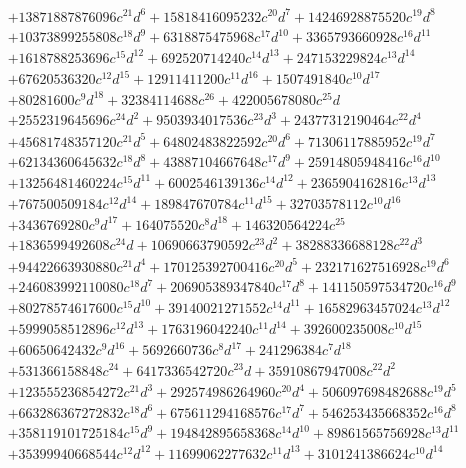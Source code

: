{\begin{align*}
&+13871887876096c^{21}d^{6}+15818416095232c^{20}d^{7}+14246928875520c^{19}d^{8}\\
&+10373899255808c^{18}d^{9}+6318875475968c^{17}d^{10}+3365793660928c^{16}d^{11}\\
&+1618788253696c^{15}d^{12}+692520714240c^{14}d^{13}+247153229824c^{13}d^{14}\\
&+67620536320c^{12}d^{15}+12911411200c^{11}d^{16}+1507491840c^{10}d^{17}\\
&+80281600c^{9}d^{18}+32384114688c^{26}+422005678080c^{25}d\\
&+2552319645696c^{24}d^{2}+9503934017536c^{23}d^{3}+24377312190464c^{22}d^{4}\\
&+45681748357120c^{21}d^{5}+64802483822592c^{20}d^{6}+71306117885952c^{19}d^{7}\\
&+62134360645632c^{18}d^{8}+43887104667648c^{17}d^{9}+25914805948416c^{16}d^{10}\\
&+13256481460224c^{15}d^{11}+6002546139136c^{14}d^{12}+2365904162816c^{13}d^{13}\\
&+767500509184c^{12}d^{14}+189847670784c^{11}d^{15}+32703578112c^{10}d^{16}\\
&+3436769280c^{9}d^{17}+164075520c^{8}d^{18}+146320564224c^{25}\\
&+1836599492608c^{24}d+10690663790592c^{23}d^{2}+38288336688128c^{22}d^{3}\\
&+94422663930880c^{21}d^{4}+170125392700416c^{20}d^{5}+232171627516928c^{19}d^{6}\\
&+246083992110080c^{18}d^{7}+206905389347840c^{17}d^{8}+141150597534720c^{16}d^{9}\\
&+80278574617600c^{15}d^{10}+39140021271552c^{14}d^{11}+16582963457024c^{13}d^{12}\\
&+5999058512896c^{12}d^{13}+1763196042240c^{11}d^{14}+392600235008c^{10}d^{15}\\
&+60650642432c^{9}d^{16}+5692660736c^{8}d^{17}+241296384c^{7}d^{18}\\
&+531366158848c^{24}+6417336542720c^{23}d+35910867947008c^{22}d^{2}\\
&+123555236854272c^{21}d^{3}+292574986264960c^{20}d^{4}+506097698482688c^{19}d^{5}\\
&+663286367272832c^{18}d^{6}+675611294168576c^{17}d^{7}+546253435668352c^{16}d^{8}\\
&+358119101725184c^{15}d^{9}+194842895658368c^{14}d^{10}+89861565756928c^{13}d^{11}\\
&+35399940668544c^{12}d^{12}+11699062277632c^{11}d^{13}+3101241386624c^{10}d^{14}\\

\end{align*}}
